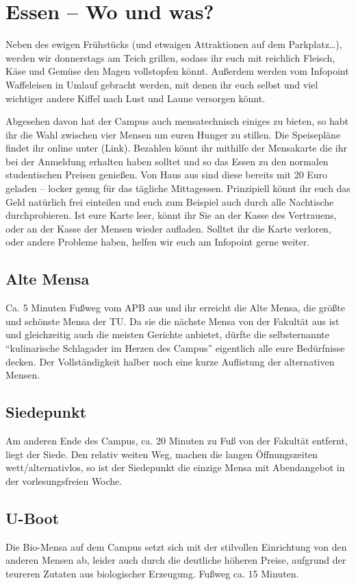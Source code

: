 \section*{Essen -- Wo und was?}
Neben des ewigen Frühstücks (und etwaigen Attraktionen auf dem Parkplatz…), werden wir donnerstags am Teich grillen, sodass ihr euch mit reichlich Fleisch, Käse und Gemüse den Magen vollstopfen könnt.
Außerdem werden vom Infopoint Waffeleisen in Umlauf gebracht werden, mit denen ihr euch selbst und viel wichtiger andere Kiffel nach Lust und Laune versorgen könnt.

Abgesehen davon hat der Campus auch mensatechnisch einiges zu bieten, so habt ihr die Wahl zwischen vier Mensen um euren Hunger zu stillen.
Die Speisepläne findet ihr online unter (Link).
Bezahlen könnt ihr mithilfe der Mensakarte die ihr bei der Anmeldung erhalten haben solltet und so das Essen zu den normalen studentischen Preisen genießen.
Von Haus aus sind diese bereits mit 20 Euro geladen -- locker genug für das tägliche Mittagessen.
Prinzipiell könnt ihr euch das Geld natürlich frei einteilen und euch zum Beispiel auch durch alle Nachtische durchprobieren.
Ist eure Karte leer, könnt ihr Sie an der Kasse des Vertrauens, oder an der Kasse der Mensen wieder aufladen.
Solltet ihr die Karte verloren, oder andere Probleme haben, helfen wir euch am Infopoint gerne weiter.

\subsection*{Alte Mensa}
Ca. 5 Minuten Fußweg vom APB aus und ihr erreicht die Alte Mensa, die größte und schönste Mensa der TU\@.
Da sie die nächste Mensa von der Fakultät aus ist und gleichzeitig auch die meisten Gerichte anbietet, dürfte die selbsternannte \enquote{kulinarische Schlagader im Herzen des Campus} eigentlich alle eure Bedürfnisse decken.
Der Vollständigkeit halber noch eine kurze Auflistung der alternativen Mensen.

\subsection*{Siedepunkt}
Am anderen Ende des Campus, ca. 20 Minuten zu Fuß von der Fakultät entfernt, liegt der Siede.
Den relativ weiten Weg, machen die langen Öffnungszeiten wett/alternativlos, so ist der Siedepunkt die einzige Mensa mit Abendangebot in der vorlesungsfreien Woche.

\subsection*{U-Boot}
Die Bio-Mensa auf dem Campus setzt sich mit der stilvollen Einrichtung von den anderen Mensen ab, leider auch durch die deutliche höheren Preise, aufgrund der teureren Zutaten aus biologischer Erzeugung.
Fußweg ca. 15 Minuten.


